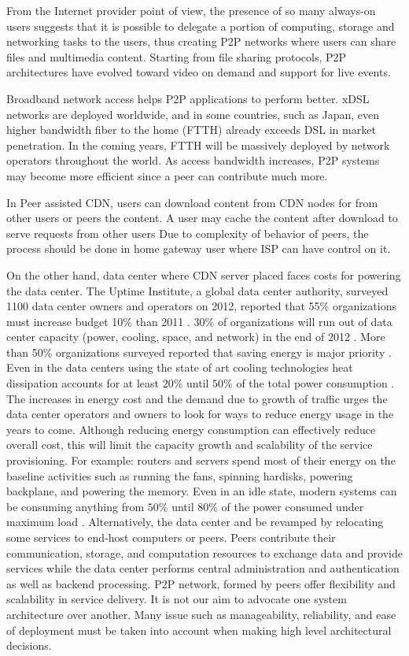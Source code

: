 \documentclass[JIP]{ipsj}
\begin{document}
From the Internet provider point of view, the presence of so many always-on users suggests that it is possible to delegate a portion of computing, storage and networking tasks to the users, thus creating P2P networks where users can share files and multimedia content.
Starting from file sharing protocols, P2P architectures have evolved toward video on demand and support for live events.

Broadband network access helps P2P applications to perform better.
xDSL networks are deployed worldwide, and in some countries, such as Japan, even higher bandwidth fiber to the home (FTTH) already exceeds DSL in market penetration.  In the coming years, FTTH will be massively deployed by network operators throughout the world.  
As access bandwidth increases, P2P systems may become more efficient since a peer can contribute much more.

In Peer assisted CDN, users can download content from CDN nodes for from other users or peers the content.
A user may cache the content after download to serve requests from other users
Due to complexity of behavior of peers, the process should be done in home gateway user where ISP can have control on it. 

On the other hand, data center where CDN server placed faces costs for powering the data center.
The Uptime Institute, a global data center authority, surveyed 1100 data center owners and operators on 2012, reported that 55\% organizations must increase budget 10\% than 2011 \cite{uptime}.  
30\% of organizations will run out of data center capacity (power, cooling, space, and network) in the end of 2012 \cite{uptime}. 
More than 50\% organizations surveyed reported that saving energy is major priority \cite{uptime}.
Even in the data centers using the state of art cooling technologies heat dissipation accounts for at least $20\%$ until $50\%$ of the total power consumption 
\cite{google}.
The increases in energy cost and the demand due to growth of traffic urges the data center operators and owners to look for ways to reduce energy usage in the years to come.
Although reducing energy consumption can effectively reduce overall cost, this will limit the capacity growth and scalability of the service provisioning.
For example: routers and servers spend most of their energy on the baseline activities such as running the fans, spinning hardisks, powering backplane, and powering the memory. 
Even in an idle state, modern systems can be consuming anything from $50\%$ until $80\%$ of the power consumed under maximum load \cite{4404806,4509688}.
Alternatively, the data center and be revamped by relocating some services to end-host computers or peers.
Peers contribute their communication, storage, and computation resources to exchange data and provide services while the data center performs central administration and authentication as well as backend processing.
P2P network, formed by peers offer flexibility and scalability in service delivery.
It is not our aim to advocate one system architecture over another.
Many issue such as manageability, reliability, and ease of deployment must be taken into account when making high level architectural decisions.
\end{document}
